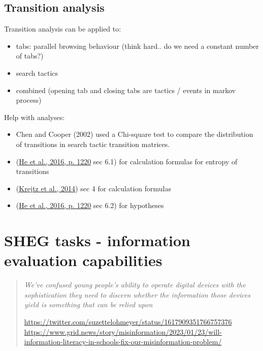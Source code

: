 \documentclass[letterpaper, nobind]{templates/ociamthesis}
\providecommand{\tightlist}{%
  \setlength{\itemsep}{0pt}\setlength{\parskip}{0pt}}
\begin{document}
\hypertarget{transition-analysis}{%
\subsection{Transition analysis}\label{transition-analysis}}

Transition analysis can be applied to:

\begin{itemize}
\tightlist
\item
  tabs: parallel browsing behaviour (think hard.. do we need a constant number of tabs?)
\item
  search tactics
\item
  combined (opening tab and closing tabs are tactics / events in markov process)
\end{itemize}

Help with analyses:

\begin{itemize}
\tightlist
\item
  Chen and Cooper (2002) used a Chi-square test to compare the distribution of transitions in search tactic transition matrices.
\item
  (\protect\hyperlink{ref-he2016beyond}{He et al., 2016, p. 1220} sec 6.1) for calculation formulas for entropy of transitions
\item
  (\protect\hyperlink{ref-krejtz2014entropy}{Krejtz et al., 2014}) sec 4 for calculation formulas
\item
  (\protect\hyperlink{ref-he2016beyond}{He et al., 2016, p. 1220} sec 6.2) for hypotheses
\end{itemize}

\hypertarget{sheg-tasks---information-evaluation-capabilities}{%
\section{SHEG tasks - information evaluation capabilities}\label{sheg-tasks---information-evaluation-capabilities}}

\begin{quote}
\emph{We've confused young people's ability to operate digital devices with the sophistication they need to discern whether the information those devices yield is something that can be relied upon}

\url{https://twitter.com/suzettelohmeyer/status/1617909351766757376}
\url{https://www.grid.news/story/misinformation/2023/01/23/will-information-literacy-in-schools-fix-our-misinformation-problem/}
\end{quote}
\end{document}
